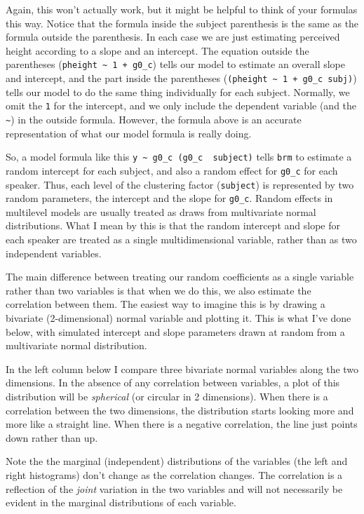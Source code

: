 \documentclass[
]{book}
\begin{document}
Again, this won't actually work, but it might be helpful to think of your formulas this way. Notice that the formula inside the subject parenthesis is the same as the formula outside the parenthesis. In each case we are just estimating perceived height according to a slope and an intercept. The equation outside the parentheses (\texttt{pheight\ \textasciitilde{}\ 1\ +\ g0\_c}) tells our model to estimate an overall slope and intercept, and the part inside the parentheses (\texttt{(pheight\ \textasciitilde{}\ 1\ +\ g0\_c\ \textbar{}subj)}) tells our model to do the same thing individually for each subject. Normally, we omit the \texttt{1} for the intercept, and we only include the dependent variable (and the \texttt{\textasciitilde{}}) in the outside formula. However, the formula above is an accurate representation of what our model formula is really doing.

So, a model formula like this \texttt{y\ \textasciitilde{}\ g0\_c\ (g0\_c\ \textbar{}\ subject)} tells \texttt{brm} to estimate a random intercept for each subject, and also a random effect for \texttt{g0\_c} for each speaker. Thus, each level of the clustering factor (\texttt{subject}) is represented by two random parameters, the intercept and the slope for \texttt{g0\_c}. Random effects in multilevel models are usually treated as draws from multivariate normal distributions. What I mean by this is that the random intercept and slope for each speaker are treated as a single multidimensional variable, rather than as two independent variables.

The main difference between treating our random coefficients as a single variable rather than two variables is that when we do this, we also estimate the correlation between them. The easiest way to imagine this is by drawing a bivariate (2-dimensional) normal variable and plotting it. This is what I've done below, with simulated intercept and slope parameters drawn at random from a multivariate normal distribution.

In the left column below I compare three bivariate normal variables along the two dimensions. In the absence of any correlation between variables, a plot of this distribution will be \emph{spherical} (or circular in 2 dimensions). When there is a correlation between the two dimensions, the distribution starts looking more and more like a straight line. When there is a negative correlation, the line just points down rather than up.

Note the the marginal (independent) distributions of the variables (the left and right histograms) don't change as the correlation changes. The correlation is a reflection of the \emph{joint} variation in the two variables and will not necessarily be evident in the marginal distributions of each variable.
\end{document}
